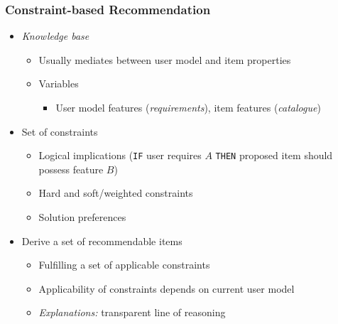\documentclass{beamer}
\begin{document}
\begin{frame}
    \frametitle{Constraint-based Recommendation}
    \begin{itemize}
    \item \emph{Knowledge base}
        \begin{itemize}
        \item Usually mediates between user model and item properties
        \item Variables
            \begin{itemize}
            \item User model features (\emph{requirements}), item features
                (\emph{catalogue})
            \end{itemize}
        \end{itemize}
    \item Set of constraints
        \begin{itemize}
        \item Logical implications (\texttt{IF} user requires $A$ \texttt{THEN}
            proposed item should possess feature $B$)
        \item Hard and soft/weighted constraints
        \item Solution preferences
        \end{itemize}
    \item Derive a set of recommendable items
        \begin{itemize}
        \item Fulfilling a set of applicable constraints
        \item Applicability of constraints depends on current user model
        \item \emph{Explanations:} transparent line of reasoning
        \end{itemize}
    \end{itemize}
\end{frame}
\end{document}
